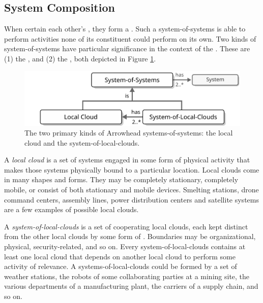 \subsection{System Composition}

When certain   each other's , they form a .
Such a system-of-systems is able to perform activities none of its constituent  could perform on its own.
Two kinds of system-of-systems have particular significance in the context of the .
These are (1) the , and (2) the , both depicted in Figure \ref{fig:system-of-systems}.

\begin{figure}[ht!]
  \centering
  \includegraphics[scale=0.9]{figures/system-of-systems}
  \caption{
    The two primary kinds of Arrowhead systems-of-systems: the local cloud and the system-of-local-clouds.
  }
  \label{fig:system-of-systems}
\end{figure}

A \textit{local cloud} is a set of systems engaged in some form of physical activity that makes those systems physically bound to a particular location.
Local clouds come in many shapes and forms.
They may be completely stationary, completely mobile, or consist of both stationary and mobile devices.
Smelting stations, drone command centers, assembly lines, power distribution centers and satellite systems are a few examples of possible local clouds.

A \textit{system-of-local-clouds} is a set of cooperating local clouds, each kept distinct from the other local clouds by some form of .
Boundaries may be organizational, physical, security-related, and so on.
Every system-of-local-clouds contains at least one local cloud that depends on another local cloud to perform some activity of relevance.
A systems-of-local-clouds could be formed by a set of weather stations, the robots of some collaborating parties at a mining site, the various departments of a manufacturing plant, the carriers of a supply chain, and so on.
